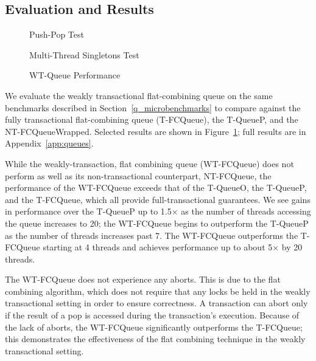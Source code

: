 \subsection{Evaluation and Results}

\begin{figure}[H]
    \centering
	\begin{minipage}{0.75\textwidth}
        \caption*{Push-Pop Test}
        \vspace{12pt}
	\end{minipage}
	\begin{minipage}{0.75\textwidth}
        \caption*{Multi-Thread Singletons Test}
	\end{minipage}
    \caption{WT-Queue Performance}
    \label{fig:wtqs}
\end{figure}


We evaluate the weakly transactional flat-combining queue on the same benchmarks described in Section~\ref{q_microbenchmarks} to compare against the fully transactional flat-combining queue (T-FCQueue), the T-QueueP, and the NT-FCQueueWrapped. Selected results are shown in Figure~\ref{fig:wtqs}; full results are in Appendix~\ref{app:queues}. 

While the weakly-transaction, flat combining queue (WT-FCQueue) does not perform as well as its non-transactional counterpart, NT-FCQueue, the performance of the WT-FCQueue exceeds that of the T-QueueO, the T-QueueP, and the T-FCQueue, which all provide full-transactional guarantees. We see gains in performance over the T-QueueP up to 1.5$\times$ as the number of threads accessing the queue increases to 20; the WT-FCQueue begins to outperform the T-QueueP as the number of threads increases past 7. The WT-FCQueue outperforms the T-FCQueue starting at 4 threads and achieves performance up to about 5$\times$ by 20 threads.
 
The WT-FCQueue does not experience any aborts. This is due to the flat combining algorithm, which does not require that any locks be held in the weakly transactional setting in order to ensure correctness. A transaction can abort only if the result of a pop is accessed during the transaction's execution.
Because of the lack of aborts, the WT-FCQueue significantly outperforms the T-FCQueue; this demonstrates the effectiveness of the flat combining technique in the weakly transactional setting. 

